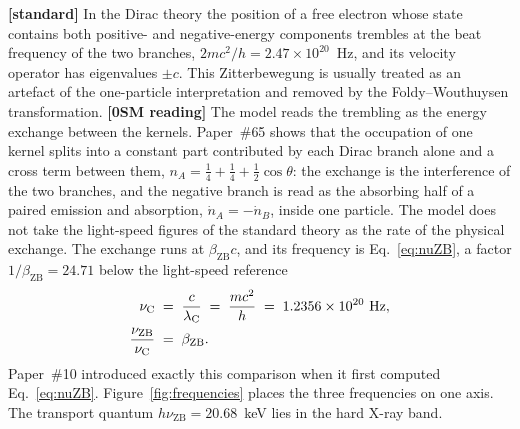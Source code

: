 \documentclass[%
 reprint, amsmath,amssymb, aps, prb, ]{revtex4-2}
\numberwithin{equation}{section}
\newcommand{\iphase}{\theta}
\newcommand{\betaZB}{\beta_{\text{ZB}}}
\newcommand{\lambdaC}{\lambda_{\text{C}}}
\newcommand{\nuZB}{\nu_{\text{ZB}}}
\newcommand{\nuC}{\nu_{\text{C}}}
\begin{document}
\textbf{[standard]} In the Dirac theory the position of a free electron whose state contains both positive- and negative-energy components trembles at the beat frequency of the two branches, $2mc^{2}/h = 2.47\times10^{20}$~Hz, and its velocity operator has eigenvalues $\pm c$. This Zitterbewegung is usually treated as an artefact of the one-particle interpretation and removed by the Foldy--Wouthuysen transformation. \textbf{[0SM reading]} The model reads the trembling as the energy exchange between the kernels. Paper~\#65 shows that the occupation of one kernel splits into a constant part contributed by each Dirac branch alone and a cross term between them, $n_A = \tfrac14 + \tfrac14 + \tfrac12\cos\iphase$: the exchange is the interference of the two branches, and the negative branch is read as the absorbing half of a paired emission and absorption, $\dot n_A = -\dot n_B$, inside one particle. The model does not take the light-speed figures of the standard theory as the rate of the physical exchange. The exchange runs at $\betaZB c$, and its frequency is Eq.~\eqref{eq:nuZB}, a factor $1/\betaZB = 24.71$ below the light-speed reference
\begin{align}
\nuC &\;=\; \frac{c}{\lambdaC} \;=\; \frac{mc^{2}}{h} \;=\; 1.2356\times10^{20}\ \text{Hz},
\notag\\
\frac{\nuZB}{\nuC} &\;=\; \betaZB .
\label{eq:nuC}
\end{align}
Paper~\#10 introduced exactly this comparison when it first computed Eq.~\eqref{eq:nuZB}. Figure~\ref{fig:frequencies} places the three frequencies on one axis. The transport quantum $h\nuZB = 20.68$~keV lies in the hard X-ray band.
\end{document}

